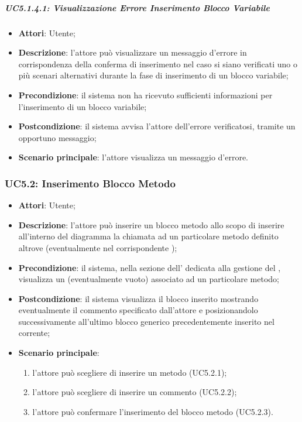 \subparagraph{UC5.1.4.1: Visualizzazione Errore Inserimento Blocco Variabile}
\label{UC5.1.4.1}
\begin{itemize}
	\item \textbf{Attori}: Utente;
	\item \textbf{Descrizione}: l'attore può visualizzare un messaggio d'errore in corrispondenza della conferma di inserimento nel caso si siano verificati uno o più scenari alternativi durante la fase di inserimento di un blocco variabile;
	\item \textbf{Precondizione}: il sistema non ha ricevuto sufficienti informazioni per l'inserimento di un blocco variabile;
	\item \textbf{Postcondizione}: il sistema avvisa l'attore dell'errore verificatosi, tramite un opportuno messaggio;
	\item \textbf{Scenario principale}: l'attore visualizza un messaggio d'errore.
\end{itemize}

\subsubsection{UC5.2: Inserimento Blocco Metodo}
\label{UC5.2}
\begin{itemize}
	\item \textbf{Attori}: Utente;
	\item \textbf{Descrizione}: l'attore può inserire un blocco metodo allo scopo di inserire all'interno del diagramma la chiamata ad un particolare metodo definito altrove (eventualmente nel corrispondente );
	\item \textbf{Precondizione}: il sistema, nella sezione dell' dedicata alla gestione del , visualizza un  (eventualmente vuoto) associato ad un particolare metodo;
	\item \textbf{Postcondizione}: il sistema visualizza il blocco inserito mostrando eventualmente il commento specificato dall'attore e posizionandolo successivamente all'ultimo blocco generico precedentemente inserito nel  corrente;
	\item \textbf{Scenario principale}:
	\begin{enumerate}
		\item l'attore può scegliere di inserire un metodo (UC5.2.1);
		\item l'attore può scegliere di inserire un commento (UC5.2.2);
		\item l'attore può confermare l'inserimento del blocco metodo (UC5.2.3).
	\end{enumerate}
\end{itemize}

